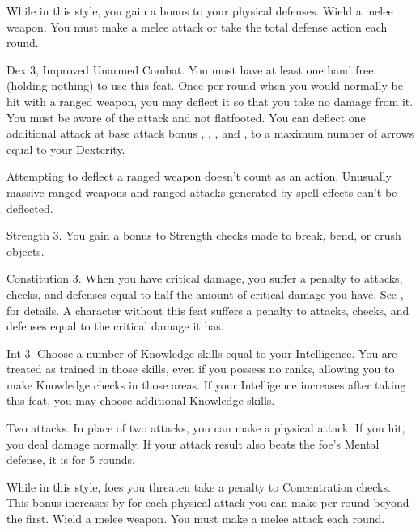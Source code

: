 \featben While in this style, you gain a  bonus to your physical defenses.
\stylereq Wield a melee weapon. You must make a melee attack or take the total defense action each round.

\featpres Dex 3, Improved Unarmed Combat.
\featben You must have at least one hand free (holding nothing) to use this feat.
Once per round when you would normally be hit with a ranged weapon, you may deflect it so that you take no damage from it.
You must be aware of the attack and not flatfooted.
You can deflect one additional attack at base attack bonus , , , and , to a maximum number of arrows equal to your Dexterity.
\par Attempting to deflect a ranged weapon doesn't count as an action.
Unusually massive ranged weapons and ranged attacks generated by spell effects can't be deflected.

\featpre Strength 3.
\featben You gain a  bonus to Strength checks made to break, bend, or crush objects.

\featpre Constitution 3.
\featben When you have critical damage, you suffer a penalty to attacks, checks, and defenses equal to half the amount of critical damage you have.
See , for details.
A character without this feat suffers a penalty to attacks, checks, and defenses equal to the critical damage it has.

\featpre Int 3.
\featben Choose a number of Knowledge skills equal to your Intelligence.
You are treated as trained in those skills, even if you possess no ranks, allowing you to make Knowledge checks in those areas.
If your Intelligence increases after taking this feat, you may choose additional Knowledge skills.

\featpre Two attacks.
\featben In place of two attacks, you can make a physical attack.
If you hit, you deal damage normally.
If your attack result also beats the foe's Mental defense, it is \disoriented for 5 rounds.

\featben While in this style, foes you threaten take a  penalty to Concentration checks.
This bonus increases by  for each physical attack you can make per round beyond the first.
\stylereq Wield a melee weapon. You must make a melee attack each round.


